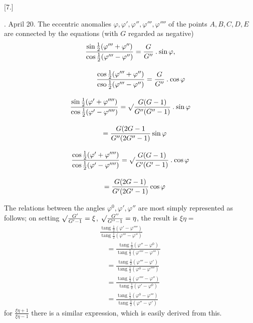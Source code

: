 \begingroup
\renewcommand{\arraystretch}{1.45}
\fancyhead[L]{}
\par\medskip{}\centerline{[7.]}\nobreak{}. April 20. The eccentric anomalies $\varphi,\varphi',\varphi'',\varphi''',\varphi''''$ of the points
$A,B,C,D,E$ are connected by the equations (with $G$ regarded as negative)
\[
\begin{gathered} \frac{\sin\frac12(\varphi'''+\varphi'')}{\cos\frac12(\varphi'''-\varphi'')} =\frac{G}{G''}\mathbin{.}\sin\varphi,\\[9pt]\quad{}\qquad \frac{\cos\frac12(\varphi'''+\varphi'')}{\operatorname{cso}\frac12(\varphi'''-\varphi'')} =\frac{G}{G''}\mathbin{.}\cos\varphi\\[9pt] \frac{\sin\frac12(\varphi'+\varphi'''')}{\cos\frac12(\varphi'-\varphi'''')} =\surd\frac{G(G-1)}{G''(G''-1)}\mathbin{.}\sin\varphi \\[9pt]\quad{}=\frac{G(2G-1}{G''(2G''-1)}\sin\varphi\\[9pt] \frac{\cos\frac12(\varphi'+\varphi'''')}{\cos\frac12(\varphi'-\varphi'''')} =\surd\frac{G(G-1)}{G'(G'-1)}\mathbin{.}\cos\varphi \\[9pt]\quad{}=\frac{G(2G-1)}{G'(2G'-1)}\cos\varphi \end{gathered}
\]

The relations between the angles $\varphi^0,\varphi',\varphi''$ are most simply represented as follows; on setting $\surd\frac{G'}{G'-1}=\xi$, $\surd\frac{G''}{G''-1}=\eta$, the result is $\xi\eta=$
\[
\begin{gathered}\frac{\operatorname{tang}\frac12(\varphi'-\varphi'''')}{\operatorname{tang}\frac12(\varphi'''-\varphi'')} \\[9pt]\quad{}=\frac{\operatorname{tang}\frac12(\varphi''-\varphi^0)}{\operatorname{tang}\frac12(\varphi''''-\varphi''')} \\[9pt]\quad{}=\frac{\operatorname{tang}\frac12(\varphi'''-\varphi')}{\operatorname{tang}\frac12(\varphi^0-\varphi'''')} \\[9pt]\quad{}=\frac{\operatorname{tang}\frac12(\varphi''''-\varphi'')}{\operatorname{tang}\frac12(\varphi'-\varphi^0)} \\[9pt]\quad{}=\frac{\operatorname{tang}\frac12(\varphi^0-\varphi''')}{\operatorname{tang}\frac12(\varphi''-\varphi')}\end{gathered}
\]
for $\frac{\xi\eta+1}{\xi\eta-1}$ there is a similar expression, which is easily derived from this.



